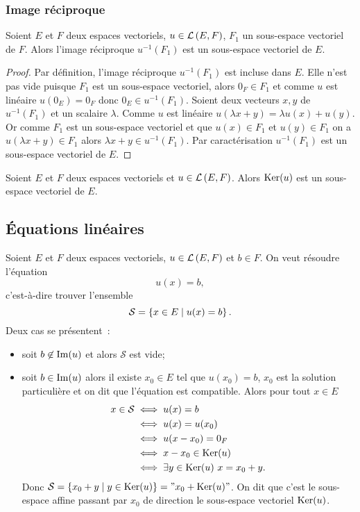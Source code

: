 \subsubsection{Image réciproque}

\begin{theo}
  Soient \(E\) et \(F\) deux espaces vectoriels, \(u \in \mathcal{L}\left(E,F\right)\), \(F_1\)
  un sous-espace vectoriel de \(F\). Alors l'image réciproque \(u^{-1}(F_1)\)
  est un sous-espace vectoriel de \(E\).
\end{theo}
\begin{proof}
  Par définition, l'image réciproque \(u^{-1}(F_1)\) est incluse dans \(E\).
  Elle n'est pas vide puisque \(F_1\) est un sous-espace vectoriel, alors \(0_F
  \in F_1\) et comme \(u\) est linéaire \(u(0_E)=0_F\) donc \(0_E \in
  u^{-1}(F_1)\). Soient deux vecteurs \(x,y\) de \(u^{-1}(F_1)\) et un scalaire
  \(\lambda\). Comme \(u\) est linéaire \(u(\lambda x+y)=\lambda u(x)+u(y)\). Or
  comme \(F_1\) est un sous-espace vectoriel et que \(u(x) \in F_1\) et \(u(y)
  \in F_1\) on a \(u(\lambda x+y) \in F_1\) alors \(\lambda x+y \in
  u^{-1}(F_1)\). Par caractérisation \(u^{-1}(F_1)\) est un sous-espace
  vectoriel de \(E\).
\end{proof}

\begin{corth}
  Soient \(E\) et \(F\) deux espaces vectoriels et \(u \in \mathcal{L}\left(E,F\right)\). Alors
  \(\operatorname{Ker}(u)\) est un sous-espace vectoriel de \(E\).
\end{corth}

\subsection{Équations linéaires}
Soient \(E\) et \(F\) deux espaces vectoriels, \(u \in \mathcal{L}\left(E,F\right)\) et \(b \in
F\). On veut résoudre l'équation
\begin{equation}
  u(x)=b,
\end{equation}
c'est-à-dire trouver l'ensemble
\begin{equation}
  \mathcal{S}=\left\{x \in E\mathrel{}\middle|\mathrel{}u(x)=b\right\}.
\end{equation}
Deux cas se présentent~:
\begin{itemize}
  \item soit \(b \not\in \operatorname{Im}(u)\) et alors \(\mathcal{S}\) est vide;
  \item soit \(b \in \operatorname{Im}(u)\) alors il existe \(x_0 \in E\) tel que
    \(u(x_0)=b\), \(x_0\) est la solution particulière et on dit que l'équation
    est compatible. Alors pour tout \(x \in E\)
    \begin{align}
      x \in \mathcal{S} &\iff u(x)=b \\
      &\iff u(x)=u(x_0) \\
      &\iff u(x-x_0)=0_F \\
      &\iff x-x_0 \in \operatorname{Ker}(u) \\
      &\iff \exists y \in \operatorname{Ker}(u) \ x=x_0+y.
    \end{align}
    Donc \(\mathcal{S}=\left\{x_0 + y\mathrel{}\middle|\mathrel{}y \in \operatorname{Ker}(u)\right\} = "x_0+\operatorname{Ker}(u)"\). On dit
    que c'est le sous-espace affine passant par \(x_0\) de direction le
    sous-espace vectoriel \(\operatorname{Ker}(u)\).
\end{itemize}

